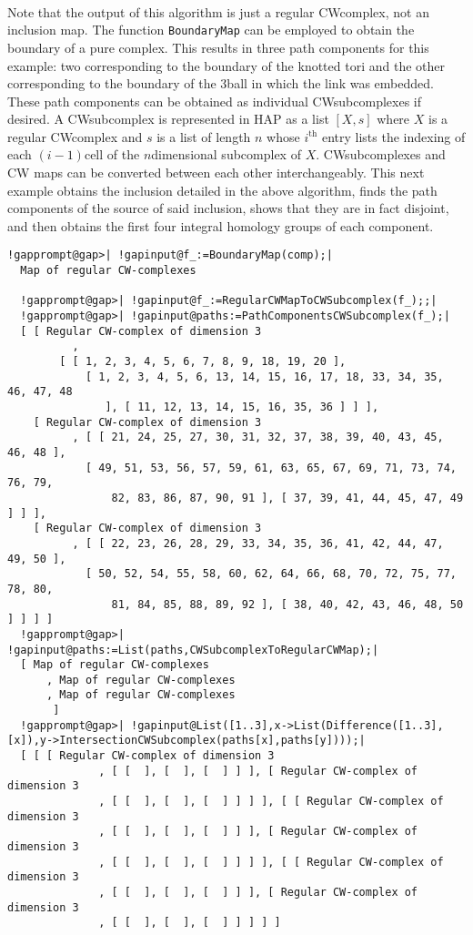\documentclass[a4paper,11pt]{report}
\begin{document}
{{\begin{Verbatim}[commandchars=!@|,fontsize=\small,frame=single,label=Example]
  
\end{Verbatim}
 Note that the output of this algorithm is just a regular
CW\texttt{}complex, not an inclusion map. The function \texttt{BoundaryMap} can be employed to obtain the boundary of a pure complex. This results in
three path components for this example: two corresponding to the boundary of
the knotted tori and the other corresponding to the boundary of the $3$\texttt{}ball in which the link was embedded. These path components
can be obtained as individual CW\texttt{}subcomplexes if desired. A
CW\texttt{}subcomplex is represented in HAP as a list $[X,s]$ where $X$ is a regular CW\texttt{}complex and $s$ is a list of length $n$ whose $i^\textrm{th}$ entry lists the indexing of each $(i-1)$\texttt{}cell of the $n$\texttt{}dimensional subcomplex of $X$. CW\texttt{}subcomplexes and CW maps can be converted between each
other interchangeably. This next example obtains the inclusion detailed in the
above algorithm, finds the path components of the source of said inclusion,
shows that they are in fact disjoint, and then obtains the first four integral
homology groups of each component. 
\begin{Verbatim}[commandchars=!@|,fontsize=\small,frame=single,label=Example]
  !gapprompt@gap>| !gapinput@f_:=BoundaryMap(comp);|
  Map of regular CW-complexes
  
  !gapprompt@gap>| !gapinput@f_:=RegularCWMapToCWSubcomplex(f_);;|
  !gapprompt@gap>| !gapinput@paths:=PathComponentsCWSubcomplex(f_);|
  [ [ Regular CW-complex of dimension 3
          , 
        [ [ 1, 2, 3, 4, 5, 6, 7, 8, 9, 18, 19, 20 ], 
            [ 1, 2, 3, 4, 5, 6, 13, 14, 15, 16, 17, 18, 33, 34, 35, 46, 47, 48 
               ], [ 11, 12, 13, 14, 15, 16, 35, 36 ] ] ], 
    [ Regular CW-complex of dimension 3
          , [ [ 21, 24, 25, 27, 30, 31, 32, 37, 38, 39, 40, 43, 45, 46, 48 ], 
            [ 49, 51, 53, 56, 57, 59, 61, 63, 65, 67, 69, 71, 73, 74, 76, 79, 
                82, 83, 86, 87, 90, 91 ], [ 37, 39, 41, 44, 45, 47, 49 ] ] ], 
    [ Regular CW-complex of dimension 3
          , [ [ 22, 23, 26, 28, 29, 33, 34, 35, 36, 41, 42, 44, 47, 49, 50 ], 
            [ 50, 52, 54, 55, 58, 60, 62, 64, 66, 68, 70, 72, 75, 77, 78, 80, 
                81, 84, 85, 88, 89, 92 ], [ 38, 40, 42, 43, 46, 48, 50 ] ] ] ]
  !gapprompt@gap>| !gapinput@paths:=List(paths,CWSubcomplexToRegularCWMap);|
  [ Map of regular CW-complexes
      , Map of regular CW-complexes
      , Map of regular CW-complexes
       ]
  !gapprompt@gap>| !gapinput@List([1..3],x->List(Difference([1..3],[x]),y->IntersectionCWSubcomplex(paths[x],paths[y])));|
  [ [ [ Regular CW-complex of dimension 3
              , [ [  ], [  ], [  ] ] ], [ Regular CW-complex of dimension 3
              , [ [  ], [  ], [  ] ] ] ], [ [ Regular CW-complex of dimension 3
              , [ [  ], [  ], [  ] ] ], [ Regular CW-complex of dimension 3
              , [ [  ], [  ], [  ] ] ] ], [ [ Regular CW-complex of dimension 3
              , [ [  ], [  ], [  ] ] ], [ Regular CW-complex of dimension 3
              , [ [  ], [  ], [  ] ] ] ] ]
  

\end{Verbatim}}}
\end{document}
